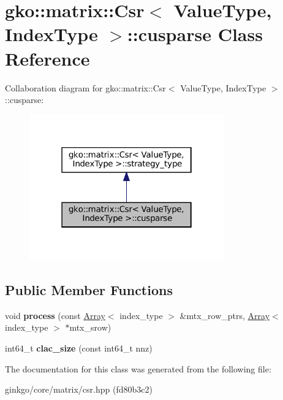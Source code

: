 \hypertarget{classgko_1_1matrix_1_1Csr_1_1cusparse}{}\section{gko\+:\+:matrix\+:\+:Csr$<$ Value\+Type, Index\+Type $>$\+:\+:cusparse Class Reference}
\label{classgko_1_1matrix_1_1Csr_1_1cusparse}


Collaboration diagram for gko\+:\+:matrix\+:\+:Csr$<$ Value\+Type, Index\+Type $>$\+:\+:cusparse\+:
\nopagebreak
\begin{figure}[H]
\begin{center}
\leavevmode
\includegraphics[width=238pt]{classgko_1_1matrix_1_1Csr_1_1cusparse__coll__graph}
\end{center}
\end{figure}
\subsection*{Public Member Functions}
\begin{DoxyCompactItemize}
\item 
\mbox{\label{classgko_1_1matrix_1_1Csr_1_1cusparse_ad913d7450cec714fda555ac1a0c781bc}} 
void {\bfseries process} (const \hyperlink{classgko_1_1Array}{Array}$<$ index\+\_\+type $>$ \&mtx\+\_\+row\+\_\+ptrs, \hyperlink{classgko_1_1Array}{Array}$<$ index\+\_\+type $>$ $\ast$mtx\+\_\+srow)
\item 
\mbox{\label{classgko_1_1matrix_1_1Csr_1_1cusparse_a3a11fb0655b828fb590a87f5f83e9373}} 
int64\+\_\+t {\bfseries clac\+\_\+size} (const int64\+\_\+t nnz)
\end{DoxyCompactItemize}


The documentation for this class was generated from the following file\+:\begin{DoxyCompactItemize}
\item 
ginkgo/core/matrix/csr.\+hpp (fd80b3c2)\end{DoxyCompactItemize}
